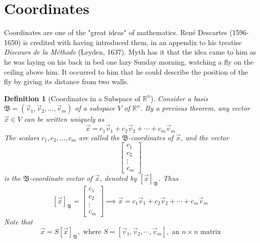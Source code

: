 \documentclass[10pt]{report}
\newtheorem{def2}{Definition}[section]
\begin{document}
\section{Coordinates}
Coordinates are one of the "great ideas" of mathematics. Ren\'{e} Descartes (1596-1650) is credited with having introduced them, in an appendix to his treatise \textit{Discours de la M\'{e}thode} (Leyden, 1637). Myth has it that the idea came to him as he was laying on his back in bed one lazy Sunday morning, watching a fly on the ceiling above him. It occurred to him that he could describe the position of the fly by giving its distance from two walls.
\begin{def2}[Coordinates in a Subspace of $\mathbb{R}^n$]
Consider a basis $\mathfrak{B}=(\vec{v}_1, \vec{v}_2, ..., \vec{v}_m)$ of a subspace $V$ of $\mathbb{R}^n$. By a previous theorem, any vector $\vec{x}\in V$ can be written uniquely as
$$\vec{x} = c_1\vec{v}_1 + c_2\vec{v}_2 + \cdots + c_m\vec{v}_m$$
The scalars $c_1, c_2,..., c_m$ are called the $\mathfrak{B}$-coordinates of $\vec{x}$, and the vector
$$\left[\begin{array}{c}
c_1\\
c_2\\
\vdots\\
c_m
\end{array}\right]$$
is the $\mathfrak{B}$-coordinate vector of $\vec{x}$, denoted by $[\vec{x}]_\mathfrak{B}$. Thus
$$[\vec{x}]_\mathfrak{B} = \left[\begin{array}{c}
c_1\\
c_2\\
\vdots\\
c_m
\end{array}\right]\implies \vec{x} = c_1\vec{v}_1 + c_2\vec{v}_2 + \cdots + c_m\vec{v}_m$$
Note that
$$\vec{x}=S[\vec{x}]_\mathfrak{B}, \text{ where } S=[\vec{v}_1, \vec{v}_2, \cdots, \vec{v}_m], \text{ an } n\times n \text{ matrix}$$
\end{def2}
\end{document}
